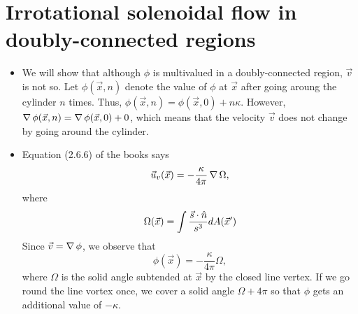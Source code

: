 \section{Irrotational solenoidal flow in doubly-connected regions}
\begin{itemize}
\item We will show that although $\phi$ is multivalued in a doubly-connected region, $\vec{v}$ is not so. Let $\phi(\vec{x}, n)$ denote the value of $\phi$ at $\vec{x}$ after going 
aroung the cylinder $n$ times. Thus, $\phi(\vec{x}, n) = \phi(\vec{x}, 0) + n\kappa$. However, $\operatorname{\nabla}{\phi(\vec{x}, n)} = \operatorname{\nabla}{\phi(\vec{x}, 0)} + 0$, which means that the velocity 
$\vec{v}$ does not change by going around the cylinder.

\item Equation (2.6.6) of the books says
\[
\vec{u}_v(\vec{x}) = -\frac{\kappa}{4\pi}\operatorname{\nabla}{\Omega},
\]
where
\[
\Omega(\vec{x}) = \int\frac{\vec{s}\cdot\hat{n}}{s^3}dA(\vec{x}^\prime)
\]
Since $\vec{v} = \operatorname{\nabla}{\phi}$, we observe that
\[
\phi(\vec{x}) = -\frac{\kappa}{4\pi}\Omega,
\]
where $\Omega$ is the solid angle subtended at $\vec{x}$ by the closed line vertex. If we go round the line vortex once, we cover a solid angle $\Omega + 4\pi$ so that $\phi$ gets an
additional value of $-\kappa$.


\end{itemize}
